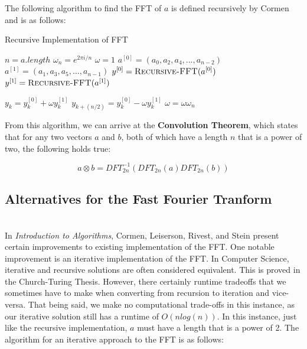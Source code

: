 \documentclass{amsproc}
\begin{document}
The following algorithm to find the FFT of $a$ is defined recursively by Cormen and is as follows:

\begin{algorithm}
\caption{Recursive Implementation of FFT}\label{fft}
\begin{algorithmic}[1]
 
\State $n = a.length$
  
\EndIf
\State $\omega_n = e^{2\pi i / n}$ 
\State $\omega = 1$
\State $a^{[0]} = (a_0, a_2, a_4, ..., a_{n-2})$ 
\State $a^{[1]} = (a_1, a_3, a_5, ..., a_{n-1})$
\State $y^{[0]} = \Call{Recursive-FFT}{a^{[0]}}$ 
\State $y^{[1]} = \Call{Recursive-FFT}{a^{[1]}}$

	\State $y_k = y_k^{[0]} + \omega y_k^{[1]}$ 
	\State $y_{k+(n/2)} = y_k^{[0]} - \omega y_k^{[1]}$
	\State $\omega = \omega \omega_n$ 
\EndFor

\State {} 

\EndProcedure
\end{algorithmic}
\end{algorithm}

From this algorithm, we can arrive at the \textbf{Convolution Theorem}, which states that for any two vectors $a$ and $b$, both of which have a length $n$ that is a power of two, the following holds true:

$$
a \otimes b = DFT_{2n}^{-1}(DFT_{2n}(a) DFT_{2n}(b))
$$

\subsection{Alternatives for the Fast Fourier Tranform}

\mbox{}	 \\
\indent In \textit{Introduction to Algorithms}, Cormen, Leiserson, Rivest, and Stein present certain improvements to existing implementation of the FFT. One notable improvement is an iterative implementation of the FFT. In Computer Science, iterative and recursive solutions are often considered equivalent. This is proved in the Church-Turing Thesis. However, there certainly runtime tradeoffs that we sometimes have to make when converting from recursion to iteration and vice-versa. That being said, we make no computational trade-offs in this instance, as our iterative solution still has a runtime of $O(nlog(n))$. In this instance, just like the recursive implementation, $a$ must have a length that is a power of 2. The algorithm for an iterative approach to the FFT is as follows:
\end{document}
